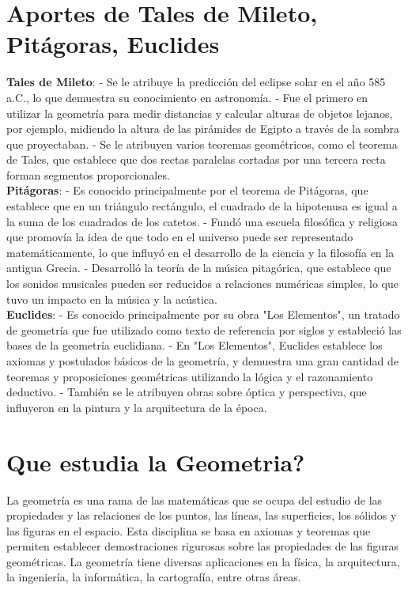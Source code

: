 \documentclass[10pt]{article}
\begin{document}
\section{Aportes de Tales de Mileto, Pitágoras, Euclides}
{\bf Tales de Mileto}:
- Se le atribuye la predicción del eclipse solar en el año 585 a.C., lo que demuestra su conocimiento en astronomía.
- Fue el primero en utilizar la geometría para medir distancias y calcular alturas de objetos lejanos, por ejemplo, midiendo la altura de las pirámides de Egipto a través de la sombra que proyectaban.
- Se le atribuyen varios teoremas geométricos, como el teorema de Tales, que establece que dos rectas paralelas cortadas por una tercera recta forman segmentos proporcionales. \\ 
{\bf Pitágoras}:
- Es conocido principalmente por el teorema de Pitágoras, que establece que en un triángulo rectángulo, el cuadrado de la hipotenusa es igual a la suma de los cuadrados de los catetos.
- Fundó una escuela filosófica y religiosa que promovía la idea de que todo en el universo puede ser representado matemáticamente, lo que influyó en el desarrollo de la ciencia y la filosofía en la antigua Grecia.
- Desarrolló la teoría de la música pitagórica, que establece que los sonidos musicales pueden ser reducidos a relaciones numéricas simples, lo que tuvo un impacto en la música y la acústica. \\
{\bf Euclides}:
- Es conocido principalmente por su obra "Los Elementos", un tratado de geometría que fue utilizado como texto de referencia por siglos y estableció las bases de la geometría euclidiana.
- En "Los Elementos", Euclides establece los axiomas y postulados básicos de la geometría, y demuestra una gran cantidad de teoremas y proposiciones geométricas utilizando la lógica y el razonamiento deductivo.
- También se le atribuyen obras sobre óptica y perspectiva, que influyeron en la pintura y la arquitectura de la época.


\section{Que estudia la Geometria?}
La geometría es una rama de las matemáticas que se ocupa del estudio de las propiedades y las relaciones de los puntos, las líneas, las superficies, los sólidos y las figuras en el espacio. Esta disciplina se basa en axiomas y teoremas que permiten establecer demostraciones rigurosas sobre las propiedades de las figuras geométricas. La geometría tiene diversas aplicaciones en la física, la arquitectura, la ingeniería, la informática, la cartografía, entre otras áreas.
\end{document}
